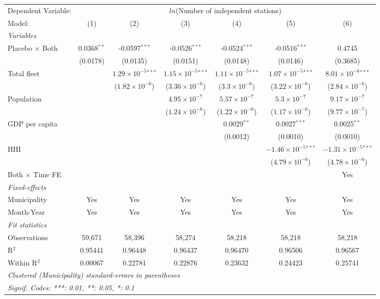 \documentclass[
]{article}
\begin{document}
\begin{tabular}{lcccccc}
\tabularnewline\midrule\midrule
Dependent Variable:&\multicolumn{6}{c}{$ln$(Number of independent stations)}\\
Model:&(1) & (2) & (3) & (4) & (5) & (6)\\
\midrule \emph{Variables}&   &   &   &   &   &  \\
Placebo $\times $ Both & 0.0368$^{**}$ & -0.0597$^{***}$ & -0.0526$^{***}$ & -0.0524$^{***}$ & -0.0516$^{***}$ & 0.4745\\
  &(0.0178) & (0.0135) & (0.0151) & (0.0148) & (0.0146) & (0.3685)\\
Total fleet &    & $1.29\times 10^{-5}$$^{***}$ & $1.15\times 10^{-5}$$^{***}$ & $1.11\times 10^{-5}$$^{***}$ & $1.07\times 10^{-5}$$^{***}$ & $8.01\times 10^{-6}$$^{***}$\\
  &   & ($1.82\times 10^{-6}$) & ($3.36\times 10^{-6}$) & ($3.3\times 10^{-6}$) & ($3.22\times 10^{-6}$) & ($2.84\times 10^{-6}$)\\
Population &    &    & $4.95\times 10^{-7}$ & $5.57\times 10^{-7}$ & $5.3\times 10^{-7}$ & $9.17\times 10^{-7}$\\
  &   &    & ($1.24\times 10^{-6}$) & ($1.22\times 10^{-6}$) & ($1.17\times 10^{-6}$) & ($9.77\times 10^{-7}$)\\
GDP per capita &    &    &    & 0.0029$^{**}$ & 0.0027$^{***}$ & 0.0025$^{**}$\\
  &   &    &    & (0.0012) & (0.0010) & (0.0010)\\
HHI &    &    &    &    & $-1.46\times 10^{-5}$$^{***}$ & $-1.31\times 10^{-5}$$^{***}$\\
  &   &    &    &    & ($4.79\times 10^{-6}$) & ($4.78\times 10^{-6}$)\\
Both $\times$ Time FE &  &  &  &  &  & Yes\\
\midrule \emph{Fixed-effects}&   &   &   &   &   &  \\
Municipality & Yes & Yes & Yes & Yes & Yes & Yes\\
Month-Year & Yes & Yes & Yes & Yes & Yes & Yes\\
\midrule \emph{Fit statistics}&  & & & & & \\
Observations & 59,671&58,396&58,274&58,218&58,218&58,218\\
R$^2$ & 0.95441&0.96448&0.96437&0.96470&0.96506&0.96567\\
Within R$^2$ & 0.00067&0.22781&0.22876&0.23632&0.24423&0.25741\\
\midrule\midrule\multicolumn{7}{l}{\emph{Clustered (Municipality) standard-errors in parentheses}}\\
\multicolumn{7}{l}{\emph{Signif. Codes: ***: 0.01, **: 0.05, *: 0.1}}\\
\end{tabular}
\end{document}
